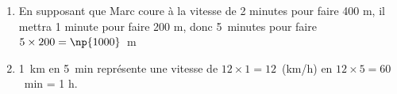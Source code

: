 
\medskip


\smallskip

%
%

\begin{enumerate}
\item %
En supposant que Marc coure  à la vitesse de 2 minutes pour faire 400 m, il mettra 1 minute pour faire 200 m, donc 5~minutes pour faire $5 \times 200 = \np{1000}$~m
\item %
1~km en 5~min représente une vitesse de $12 \times 1 = 12$~(km/h) en $12 \times 5 = 60$~min = 1 h. 
\end{enumerate}



%
%
%

